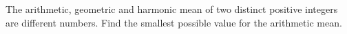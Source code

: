 The arithmetic, geometric and harmonic mean of two distinct positive integers are different numbers. Find the smallest possible value for the arithmetic mean.